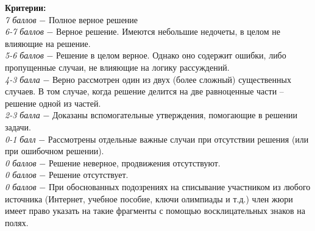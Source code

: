  \textbf{Критерии:} \\
\textit{7 баллов} $-$ Полное верное решение\\
\textit{6-7 баллов} $-$ Верное решение. Имеются небольшие недочеты, в целом не влияющие на решение.\\
\textit{5-6 баллов} $-$ Решение в целом верное. Однако оно содержит ошибки, либо пропущенные случаи, не влияющие на логику рассуждений.\\
\textit{4-3 балла} $-$ Верно рассмотрен один из двух (более сложный) существенных случаев. В том случае, когда решение делится на две равноценные части – решение одной из частей. 
\\
\textit{2-3 балла} $-$ Доказаны вспомогательные утверждения, помогающие в решении задачи.
\\
\textit{0-1 балл} $-$ Рассмотрены отдельные важные случаи при отсутствии решения (или при ошибочном решении).
\\
\textit{0 баллов} $-$ Решение неверное, продвижения отсутствуют.\\
\textit{0 баллов} $-$ Решение отсутствует.
\\
\textit{0 баллов} $-$ При обоснованных подозрениях на списывание участником из любого источника (Интернет, учебное пособие, ключи олимпиады и т.д.) член жюри имеет право указать на такие фрагменты с помощью восклицательных знаков на полях. \\